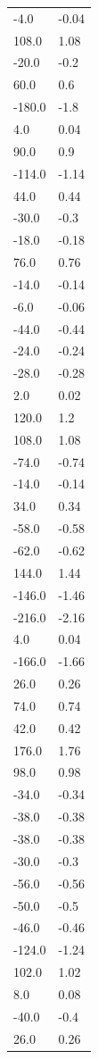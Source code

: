 \begin{longtable}{ll}
-4.0 & -0.04 \\
108.0 & 1.08 \\
-20.0 & -0.2 \\
60.0 & 0.6 \\
-180.0 & -1.8 \\
4.0 & 0.04 \\
90.0 & 0.9 \\
-114.0 & -1.14 \\
44.0 & 0.44 \\
-30.0 & -0.3 \\
-18.0 & -0.18 \\
76.0 & 0.76 \\
-14.0 & -0.14 \\
-6.0 & -0.06 \\
-44.0 & -0.44 \\
-24.0 & -0.24 \\
-28.0 & -0.28 \\
2.0 & 0.02 \\
120.0 & 1.2 \\
108.0 & 1.08 \\
-74.0 & -0.74 \\
-14.0 & -0.14 \\
34.0 & 0.34 \\
-58.0 & -0.58 \\
-62.0 & -0.62 \\
144.0 & 1.44 \\
-146.0 & -1.46 \\
-216.0 & -2.16 \\
4.0 & 0.04 \\
-166.0 & -1.66 \\
26.0 & 0.26 \\
74.0 & 0.74 \\
42.0 & 0.42 \\
176.0 & 1.76 \\
98.0 & 0.98 \\
-34.0 & -0.34 \\
-38.0 & -0.38 \\
-38.0 & -0.38 \\
-30.0 & -0.3 \\
-56.0 & -0.56 \\
-50.0 & -0.5 \\
-46.0 & -0.46 \\
-124.0 & -1.24 \\
102.0 & 1.02 \\
8.0 & 0.08 \\
-40.0 & -0.4 \\
26.0 & 0.26 \\

\end{longtable}
